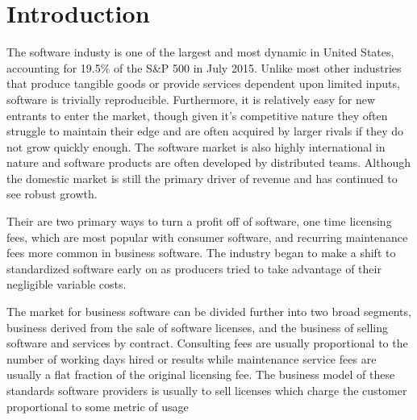 \section*{Introduction}

The software industy is one of the largest and most dynamic in United States, accounting for 19.5\% of the S\&P 500 in July 2015.\autocite[6]{SurveysSoftware2015}
Unlike most other industries that produce tangible goods or provide services dependent upon limited inputs, software is trivially reproducible.\autocite[3]{buxmann2012software}
Furthermore, it is relatively easy for new entrants to enter the market, though given it's competitive nature they often struggle to maintain their edge and are often acquired by larger rivals if they do not grow quickly enough.\autocite[]{ValuelineOverview}
The software market is also highly international in nature and software products are often developed by distributed teams.\autocite[3]{buxmann2012software}
Although the domestic market is still the primary driver of revenue and has continued to see robust growth.\autocite[]{ITSoftwareEconomist}

Their are two primary ways to turn a profit off of software, one time licensing fees, which are most popular with consumer software, and recurring maintenance fees more common in business software.
The industry began to make a shift to standardized software early on as producers tried to take advantage of their negligible variable costs.\autocite[14]{buxmann2012software}

The market for business software can be divided further into two broad segments, business derived from the sale of software licenses, and the business of selling software and services by contract.\autocite[]{ValuelineOverview}
Consulting fees are usually proportional to the number of working days hired or results while maintenance service fees are usually a flat fraction of the original licensing fee.\autocite[16]{buxmann2012software}
The business model of these standards software providers is usually to sell licenses which charge the customer proportional to some metric of usage\autocite[14]{buxmann2012software}

